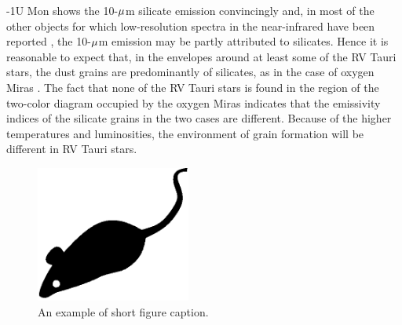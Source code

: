 \documentclass[useAMS,usenatbib]{biom}
\begin{document}
\looseness-1U Mon shows the 10-$\mu$m silicate emission convincingly and, in
most of the other objects for which low-resolution spectra in the
near-infrared have been reported \citep{b5,b19}, the 10-$\mu$m
emission may be partly attributed to silicates. Hence it is
reasonable to expect that, in the envelopes around at least some
of the RV Tauri stars, the dust grains are predominantly of
silicates, as in the case of oxygen Miras \citep{b21}. The fact
that none of the RV Tauri stars is found in the region of the
two-color diagram occupied by the oxygen Miras indicates that the
emissivity indices of the silicate grains in the two cases are
different. Because of the higher temperatures and luminosities,
the environment of grain formation will be different in RV Tauri
stars.
\begin{figure}[b]
  \centerline{\includegraphics[width=2in]{mouse.eps}}
  \caption{An example of short figure caption.}
\vspace*{-3pt}
\label{f:shortmouse}
\end{figure}
\end{document}
